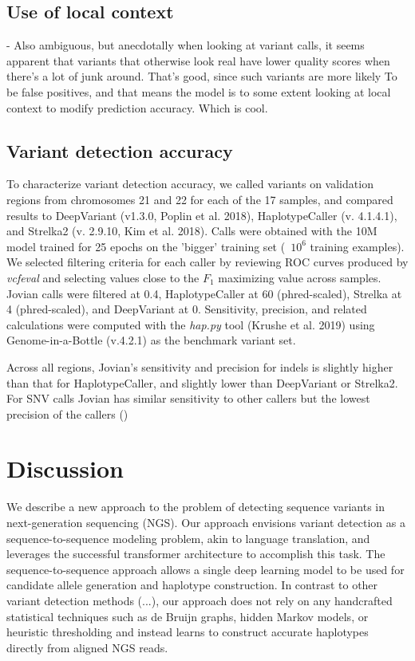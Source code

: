 \documentclass[]{article}
\begin{document}
\subsection{Use of local context}
 - Also ambiguous, but anecdotally when looking at variant calls, it seems apparent that variants that otherwise look real have lower quality scores when there's a lot of junk around. That's good, since such variants are more likely To
 be false positives, and that means the model is to some extent looking at local context to modify prediction accuracy. Which is cool. 



\subsection{Variant detection accuracy}

To characterize variant detection accuracy, we called variants on validation regions from chromosomes 21 and 22 for each of the 17 samples, and compared results to DeepVariant (v1.3.0, Poplin et al. 2018), HaplotypeCaller (v. 4.1.4.1), and Strelka2 (v. 2.9.10, Kim et al. 2018). Calls were obtained with the 10M model trained for 25 epochs on the 'bigger' training set (~$10^6$ training examples). We selected filtering criteria for each caller by reviewing ROC curves produced by \textit{vcfeval} and selecting values close to the $F_1$ maximizing value across samples. Jovian calls were filtered at 0.4, HaplotypeCaller at 60 (phred-scaled), Strelka at 4 (phred-scaled), and DeepVariant at 0. Sensitivity, precision, and related calculations were computed with the \textit{hap.py} tool (Krushe et al. 2019) using Genome-in-a-Bottle (v.4.2.1) as the benchmark variant set. 

Across all regions, Jovian's sensitivity and precision for indels is slightly higher than that for HaplotypeCaller, and slightly lower than DeepVariant or Strelka2. For SNV calls Jovian has similar sensitivity to other callers but the lowest precision of the callers () 

 


\section{Discussion}

We describe a new approach to the problem of detecting sequence variants in next-generation sequencing (NGS). Our approach envisions variant detection as a sequence-to-sequence modeling problem, akin to language translation, and leverages the successful transformer architecture to accomplish this task. The sequence-to-sequence approach allows a single deep learning model to be used for candidate allele generation and haplotype construction.  In contrast to other variant detection methods (...), our approach does not rely on any handcrafted statistical techniques such as de Bruijn graphs, hidden Markov models, or heuristic thresholding and instead learns to construct accurate haplotypes directly from aligned NGS reads. 
 
\end{document}
